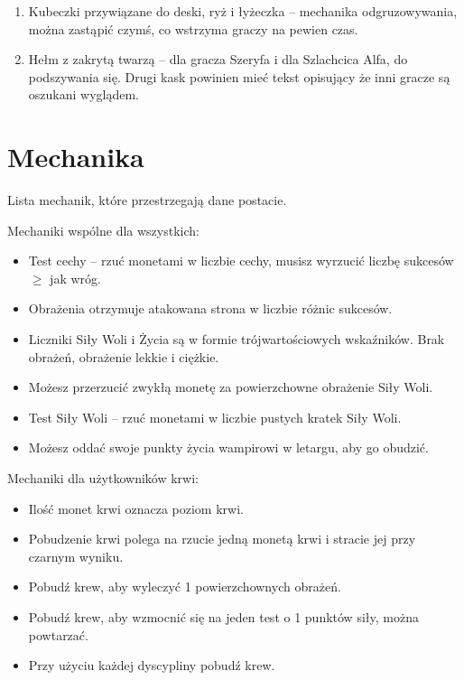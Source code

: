 \begin{enumerate}
		\item Kubeczki przywiązane do deski, ryż i łyżeczka -- mechanika odgruzowywania, można zastąpić czymś, co wstrzyma graczy na pewien czas.
		\item Hełm z zakrytą twarzą -- dla gracza Szeryfa i dla Szlachcica Alfa, do podszywania się.
			Drugi kask powinien mieć tekst opisujący że inni gracze są oszukani wyglądem.
	\end{enumerate}
	
	
\section{Mechanika}
	Lista mechanik, które przestrzegają dane postacie.
	
	Mechaniki wspólne dla wszystkich:
	\begin{itemize}
		\item Test cechy -- rzuć monetami w liczbie cechy, musisz wyrzucić liczbę sukcesów $\geqslant$ jak wróg.
		\item Obrażenia otrzymuje atakowana strona w liczbie różnic sukcesów.
		\item Liczniki Siły Woli i Życia są w formie trójwartościowych wskaźników. Brak obrażeń, obrażenie lekkie i ciężkie.
		\item Możesz przerzucić zwykłą monetę za powierzchowne obrażenie Siły Woli.
		\item Test Siły Woli -- rzuć monetami w liczbie pustych kratek Siły Woli.
		\item Możesz oddać swoje punkty życia wampirowi w letargu, aby go obudzić.
	\end{itemize}

	Mechaniki dla użytkowników krwi:
	\begin{itemize}
		\item Ilość monet krwi oznacza poziom krwi.
		\item Pobudzenie krwi polega na rzucie jedną monetą krwi i stracie jej przy czarnym wyniku.
		\item Pobudź krew, aby wyleczyć 1 powierzchownych obrażeń.
		\item Pobudź krew, aby wzmocnić się na jeden test o 1 punktów siły, można powtarzać.
		\item Przy użyciu każdej dyscypliny pobudź krew.
	\end{itemize}

